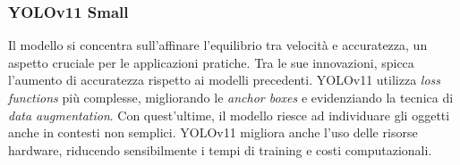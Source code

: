 \documentclass[12pt]{article}
\begin{document}
\subsubsection{YOLOv11 Small} 
Il modello si concentra sull'affinare l'equilibrio tra velocità e accuratezza, un aspetto cruciale per le applicazioni pratiche. Tra le sue innovazioni, spicca l'aumento di accuratezza rispetto ai modelli precedenti. YOLOv11\cite{YOLOv11} utilizza \textit{loss functions} più complesse, migliorando le \textit{anchor boxes} e evidenziando la tecnica di \textit{data augmentation}. Con quest'ultime, il modello riesce ad individuare gli oggetti anche in contesti non semplici. YOLOv11 migliora anche l'uso delle risorse hardware, riducendo sensibilmente i tempi di training e costi computazionali.
\end{document}
